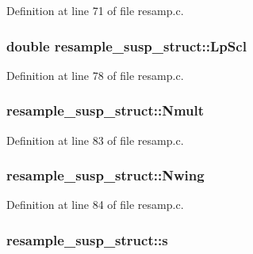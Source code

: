 Definition at line 71 of file resamp.\+c.

\subsubsection[{\texorpdfstring{Lp\+Scl}{LpScl}}]{\setlength{\rightskip}{0pt plus 5cm}double resample\+\_\+susp\+\_\+struct\+::\+Lp\+Scl}\hypertarget{structresample__susp__struct_aec6e0c2a273dc072c3eb41b0ac75f774}{}\label{structresample__susp__struct_aec6e0c2a273dc072c3eb41b0ac75f774}


Definition at line 78 of file resamp.\+c.

\subsubsection[{\texorpdfstring{Nmult}{Nmult}}]{ resample\+\_\+susp\+\_\+struct\+::\+Nmult}\hypertarget{structresample__susp__struct_aa8ff415b23d5937dbbe353fb2e7cbee2}{}\label{structresample__susp__struct_aa8ff415b23d5937dbbe353fb2e7cbee2}


Definition at line 83 of file resamp.\+c.

\subsubsection[{\texorpdfstring{Nwing}{Nwing}}]{ resample\+\_\+susp\+\_\+struct\+::\+Nwing}\hypertarget{structresample__susp__struct_a28adb1ecfd7070335354e72d8ea2be84}{}\label{structresample__susp__struct_a28adb1ecfd7070335354e72d8ea2be84}


Definition at line 84 of file resamp.\+c.

\subsubsection[{\texorpdfstring{s}{s}}]{ resample\+\_\+susp\+\_\+struct\+::s}\hypertarget{structresample__susp__struct_ab5e90e8f40ae823d394d8a03956d6a0e}{}\label{structresample__susp__struct_ab5e90e8f40ae823d394d8a03956d6a0e}


